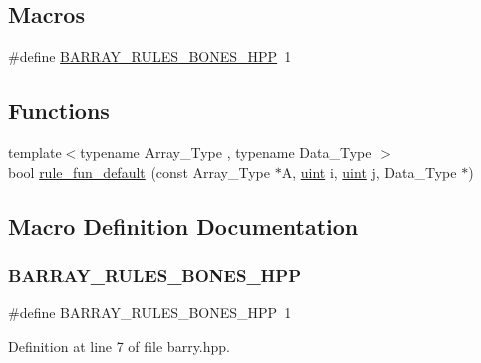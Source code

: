 \subsection*{Macros}
\begin{DoxyCompactItemize}
\item 
\#define \hyperlink{barry_8hpp_a334efcd2fa320e5b31d9a9971180d06f}{B\+A\+R\+R\+A\+Y\+\_\+\+R\+U\+L\+E\+S\+\_\+\+B\+O\+N\+E\+S\+\_\+\+H\+PP}~1
\end{DoxyCompactItemize}
\subsection*{Functions}
\begin{DoxyCompactItemize}
\item 
{\footnotesize template$<$typename Array\+\_\+\+Type , typename Data\+\_\+\+Type $>$ }\\bool \hyperlink{rules-bones_8hpp_a1afd3e20386fc5b8d5ad45047c875375}{rule\+\_\+fun\+\_\+default} (const Array\+\_\+\+Type $\ast$A, \hyperlink{typedefs_8hpp_a91ad9478d81a7aaf2593e8d9c3d06a14}{uint} i, \hyperlink{typedefs_8hpp_a91ad9478d81a7aaf2593e8d9c3d06a14}{uint} j, Data\+\_\+\+Type $\ast$)
\end{DoxyCompactItemize}


\subsection{Macro Definition Documentation}
\mbox{\label{barry_8hpp_a334efcd2fa320e5b31d9a9971180d06f}} 
\subsubsection{\texorpdfstring{B\+A\+R\+R\+A\+Y\+\_\+\+R\+U\+L\+E\+S\+\_\+\+B\+O\+N\+E\+S\+\_\+\+H\+PP}{BARRAY\_RULES\_BONES\_HPP}}
{\footnotesize\ttfamily \#define B\+A\+R\+R\+A\+Y\+\_\+\+R\+U\+L\+E\+S\+\_\+\+B\+O\+N\+E\+S\+\_\+\+H\+PP~1}



Definition at line 7 of file barry.\+hpp.



